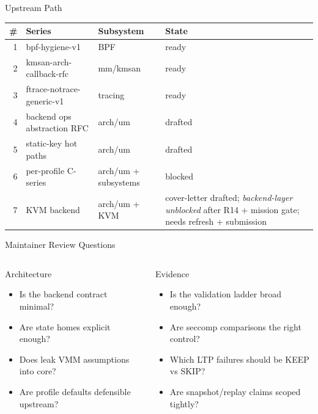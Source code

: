 \documentclass[aspectratio=169,11pt]{beamer}
\begin{document}
\begin{frame}{Upstream Path}
\small
\begin{tabularx}{\textwidth}{@{}r p{}p{}X@{}}
\toprule
\# & Series & Subsystem & State \\
\midrule
1 & bpf-hygiene-v1 & BPF & ready \\
2 & kmsan-arch-callback-rfc & mm/kmsan & ready \\
3 & ftrace-notrace-generic-v1 & tracing & ready \\
4 & backend ops abstraction RFC & arch/um & drafted \\
5 & static-key hot paths & arch/um & drafted \\
6 & per-profile C-series & arch/um + subsystems & blocked \\
7 & KVM backend & arch/um + KVM & cover-letter drafted; \emph{backend-layer unblocked} after R14 + mission gate; needs refresh + submission \\
\bottomrule
\end{tabularx}
\end{frame}

\begin{frame}{Maintainer Review Questions}
\small
\begin{columns}[T,onlytextwidth]
\begin{block}{Architecture}
\begin{itemize}
  \item Is the backend contract minimal?
  \item Are state homes explicit enough?
  \item Does \KVMvTwo{} leak VMM assumptions into \UML{} core?
  \item Are profile defaults defensible upstream?
\end{itemize}
\end{block}
\begin{block}{Evidence}
\begin{itemize}
  \item Is the validation ladder broad enough?
  \item Are seccomp comparisons the right control?
  \item Which LTP failures should be KEEP vs SKIP?
  \item Are snapshot/replay claims scoped tightly?
\end{itemize}
\end{block}
\end{columns}
\end{frame}
\end{document}

